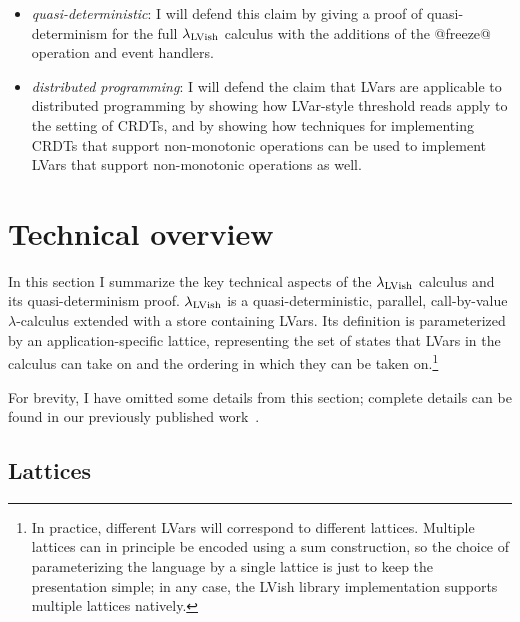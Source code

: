 \documentclass{article}
\begin{document}
\begin{itemize}
  \item \emph{quasi-deterministic}: I will defend this claim by giving
    a proof of quasi-determinism for the full $\lambda_{\textrm{LVish}}$ calculus
    with the additions of the @freeze@ operation and event handlers.

  \item \emph{distributed programming}: I will defend the claim that
    LVars are applicable to distributed programming by showing how
    LVar-style threshold reads apply to the setting of CRDTs, and by
    showing how techniques for implementing CRDTs that support
    non-monotonic operations can be used to implement LVars that
    support non-monotonic operations as well.
\end{itemize}

\section{Technical overview}\label{s:technical-overview}

In this section I summarize the key technical aspects of the
$\lambda_{\textrm{LVish}}$ calculus and its quasi-determinism proof.
$\lambda_{\textrm{LVish}}$ is a quasi-deterministic, parallel, call-by-value
$\lambda$-calculus extended with a store containing LVars.  Its
definition is parameterized by an application-specific lattice,
representing the set of states that LVars in the calculus can take on
and the ordering in which they can be taken on.\footnote{In practice,
  different LVars will correspond to different lattices.  Multiple
  lattices can in principle be encoded using a sum construction, so
  the choice of parameterizing the language by a single lattice is
  just to keep the presentation simple; in any case, the LVish library
  implementation supports multiple lattices natively.}

For brevity, I have omitted some details from this section; complete
details can be found in our previously published
work~\cite{LVars-paper, LVars-TR, Freeze-paper, Freeze-TR}.

\subsection{Lattices}
\end{document}
